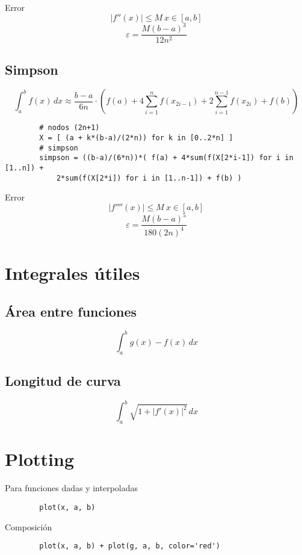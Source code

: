 \documentclass{article}
\begin{document}
	Error
	$$
		|f''(x)| \le M \ x \in [a, b]
	$$
	$$
		\varepsilon = \frac{M(b-a)^3}{12n^2}
	$$

	\pagebreak

	\subsection{Simpson}
	
	$$
		\int_a^b f(x) \, dx \approx \frac{b-a}{6n} \cdot \left( f(a) + 4 \sum_{i=1}^{n} f(x_{2i-1}) + 2 \sum_{i=1}^{n-1} f(x_{2i}) + f(b) \right)
	$$
	
	\begin{verbatim}
		# nodos (2n+1)
		X = [ (a + k*(b-a)/(2*n)) for k in [0..2*n] ]
		# simpson
		simpson = ((b-a)/(6*n))*( f(a) + 4*sum(f(X[2*i-1]) for i in [1..n]) +
		    2*sum(f(X[2*i]) for i in [1..n-1]) + f(b) )
	\end{verbatim}
	
	Error
	$$
		|f''''(x)| \le M \ x \in [a, b]
	$$
	$$
		\varepsilon = \frac{M(b-a)^5}{180(2n)^4}
	$$
	
	\section{Integrales útiles}
	
	\subsection{Área entre funciones}
	
	$$
		\int_a^b g(x) - f(x) \, dx
	$$
	
	\subsection{Longitud de curva}
	
	$$
		\int_a^b \sqrt{1 + |f'(x)|^2} \, dx
	$$
	
	\section{Plotting}
	
	Para funciones dadas y interpoladas
	
	\begin{verbatim}
		plot(x, a, b)
	\end{verbatim}

	Composición
	
	\begin{verbatim}
		plot(x, a, b) + plot(g, a, b, color='red')
	\end{verbatim}
\end{document}
